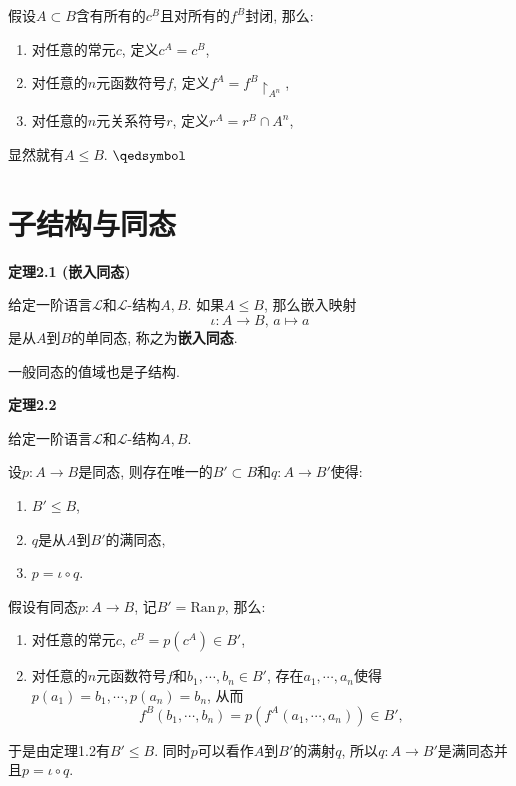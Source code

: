 \documentclass[UTF8]{ctexart}
\begin{document}

假设$A\subset B$含有所有的$c^B$且对所有的$f^B$封闭, 那么:
\begin{enumerate}
    \item 对任意的常元$c$, 定义$c^A=c^B$,
    \item 对任意的$n$元函数符号$f$, 定义$f^A=f^B\!\restriction_{A^n}$,
    \item 对任意的$n$元关系符号$r$, 定义$r^A=r^B\cap A^n$,
\end{enumerate}
显然就有$A\leqslant B$. \hfill $\qedsymbol$





\newpage

\section{子结构与同态}

\hypertarget{sec:定理2.1}{}
\noindent\textbf{定理2.1 (嵌入同态)}

给定一阶语言$\mathcal{L}$和$\mathcal{L}$-结构$A,B$.
如果$A\leqslant B$, 那么嵌入映射
\[
    \iota:A\to B,\,a\mapsto a
\]
是从$A$到$B$的单同态, 称之为\textbf{嵌入同态}.

\vspace{10pt}

一般同态的值域也是子结构.

\vspace{10pt}

\hypertarget{sec:定理2.2}{}
\noindent\textbf{定理2.2}

给定一阶语言$\mathcal{L}$和$\mathcal{L}$-结构$A,B$.

设$p:A\to B$是同态, 则存在唯一的$B'\subset B$和$q:A\to B'$使得:
\begin{enumerate}
    \item $B'\leqslant B$,
    \item $q$是从$A$到$B'$的满同态,
    \item $p=\iota\circ q$.
\end{enumerate}



假设有同态$p:A\to B$, 记$B'=\mathrm{Ran}\,p$, 那么:
\begin{enumerate}
    \item 对任意的常元$c$, $c^{B}=p(c^A)\in B'$,
    \item 对任意的$n$元函数符号$f$和$b_1,\cdots,b_n\in B'$,
    存在$a_1,\cdots,a_n$使得$p(a_1)=b_1,\cdots,p(a_n)=b_n$, 从而
    \[
        f^B(b_1,\cdots,b_n)=p(f^A(a_1,\cdots,a_n))\in B',
    \]
\end{enumerate}
于是由定理1.2有$B'\leqslant B$.
同时$p$可以看作$A$到$B'$的满射$q$, 所以$q:A\to B'$是满同态并且$p=\iota\circ q$.
\end{document}
